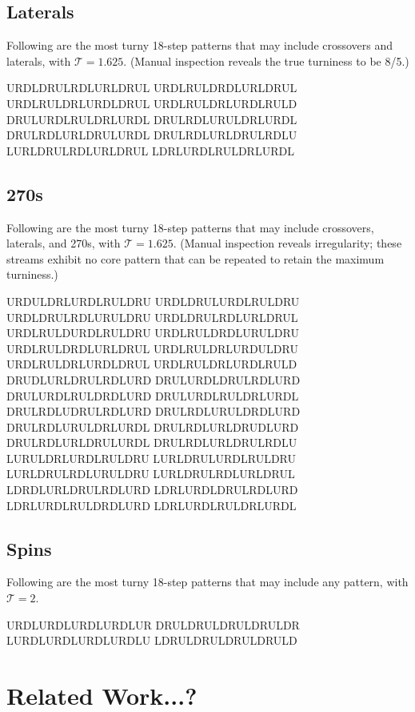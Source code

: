 \documentclass[10pt]{sigplanconf}
\begin{document}
\subsection{Laterals}

Following are the most turny 18-step patterns that may include crossovers and laterals, with $\mathcal{T}=1.625$. (Manual inspection reveals the true turniness to be 8/5.)

\noindent
URDLDRULRDLURLDRUL
URDLRULDRDLURLDRUL
URDLRULDRLURDLDRUL
URDLRULDRLURDLRULD
DRULURDLRULDRLURDL
DRULRDLURULDRLURDL
DRULRDLURLDRULURDL
DRULRDLURLDRULRDLU
LURLDRULRDLURLDRUL
LDRLURDLRULDRLURDL

\subsection{270s}

Following are the most turny 18-step patterns that may include crossovers, laterals, and 270s, with $\mathcal{T}=1.625$.
(Manual inspection reveals irregularity; these streams exhibit no core pattern that can be repeated to retain the maximum turniness.)

\noindent
URDULDRLURDLRULDRU
URDLDRULURDLRULDRU
URDLDRULRDLURULDRU
URDLDRULRDLURLDRUL
URDLRULDURDLRULDRU
URDLRULDRDLURULDRU
URDLRULDRDLURLDRUL
URDLRULDRLURDULDRU
URDLRULDRLURDLDRUL
URDLRULDRLURDLRULD
DRUDLURLDRULRDLURD
DRULURDLDRULRDLURD
DRULURDLRULDRDLURD
DRULURDLRULDRLURDL
DRULRDLUDRULRDLURD
DRULRDLURULDRDLURD
DRULRDLURULDRLURDL
DRULRDLURLDRUDLURD
DRULRDLURLDRULURDL
DRULRDLURLDRULRDLU
LURULDRLURDLRULDRU
LURLDRULURDLRULDRU
LURLDRULRDLURULDRU
LURLDRULRDLURLDRUL \\
LDRDLURLDRULRDLURD
LDRLURDLDRULRDLURD
LDRLURDLRULDRDLURD
LDRLURDLRULDRLURDL

\subsection{Spins}

Following are the most turny 18-step patterns that may include any pattern, with $\mathcal{T}=2$.

\noindent
URDLURDLURDLURDLUR
DRULDRULDRULDRULDR
LURDLURDLURDLURDLU
LDRULDRULDRULDRULD

\section{Related Work...?}
\end{document}
